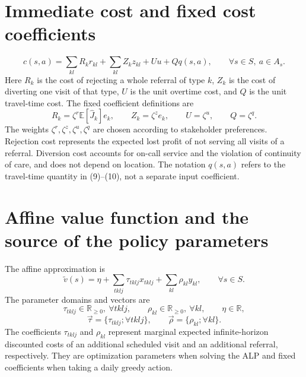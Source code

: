 \documentclass{article}
\begin{document}
\section*{Immediate cost and fixed cost coefficients}
\begin{equation}
c(s,a)=\sum_{kl}R_kr_{kl}+\sum_{kl}Z_kz_{kl}+Uu+Qq(s,a),
\qquad\forall s\in S,\ a\in A_s.
\tag{14}
\end{equation}
Here $R_k$ is the cost of rejecting a whole referral of type $k$, $Z_k$ is the cost of diverting one visit of that type, $U$ is the unit overtime cost, and $Q$ is the unit travel-time cost. The fixed coefficient definitions are
\[
R_k=\zeta^r\mathbb E[\hat J_k]e_k,\qquad
Z_k=\zeta^z e_k,\qquad
U=\zeta^u,\qquad Q=\zeta^q.
\]
The weights $\zeta^r,\zeta^z,\zeta^u,\zeta^q$ are chosen according to stakeholder preferences. Rejection cost represents the expected lost profit of not serving all visits of a referral. Diversion cost accounts for on-call service and the violation of continuity of care, and does not depend on location. The notation $q(s,a)$ refers to the travel-time quantity in (9)--(10), not a separate input coefficient.

\section*{Affine value function and the source of the policy parameters}
The affine approximation is
\begin{equation}
\widetilde v(s)=\eta+\sum_{tklj}\tau_{tklj}x_{tklj}+\sum_{kl}\rho_{kl}y_{kl},
\qquad\forall s\in S.
\tag{17}
\end{equation}
The parameter domains and vectors are
\[
\tau_{tklj}\in\mathbb R_{\geq0},\ \forall tklj,\qquad
\rho_{kl}\in\mathbb R_{\geq0},\ \forall kl,\qquad
\eta\in\mathbb R,
\]
\[
\vec\tau=\{\tau_{tklj};\forall tklj\},\qquad
\vec\rho=\{\rho_{kl};\forall kl\}.
\]
The coefficients $\tau_{tklj}$ and $\rho_{kl}$ represent marginal expected infinite-horizon discounted costs of an additional scheduled visit and an additional referral, respectively. They are optimization parameters when solving the ALP and fixed coefficients when taking a daily greedy action.
\end{document}

